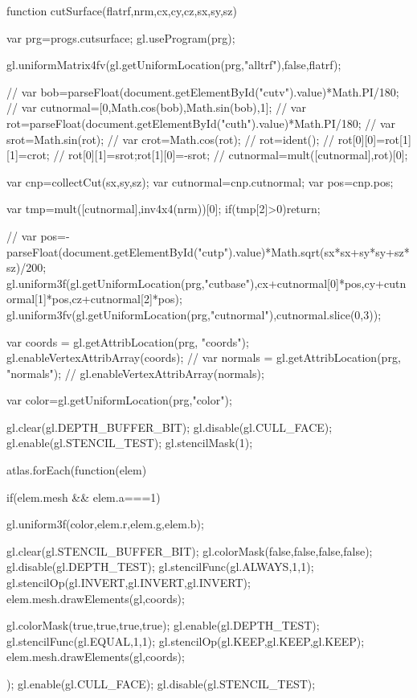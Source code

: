             function cutSurface(flatrf,nrm,cx,cy,cz,sx,sy,sz){
                var prg=progs.cutsurface;
                gl.useProgram(prg);
        
                gl.uniformMatrix4fv(gl.getUniformLocation(prg,"alltrf"),false,flatrf);
                
//                var bob=parseFloat(document.getElementById("cutv").value)*Math.PI/180;
//                var cutnormal=[0,Math.cos(bob),Math.sin(bob),1];
//                var rot=parseFloat(document.getElementById("cuth").value)*Math.PI/180;
//                var srot=Math.sin(rot);
//                var crot=Math.cos(rot);
//                rot=ident();
//                rot[0][0]=rot[1][1]=crot;
//                rot[0][1]=srot;rot[1][0]=-srot;
//                cutnormal=mult([cutnormal],rot)[0];

                var cnp=collectCut(sx,sy,sz);
                var cutnormal=cnp.cutnormal;
                var pos=cnp.pos;

                var tmp=mult([cutnormal],inv4x4(nrm))[0];
                if(tmp[2]>0)return;
                
//                var pos=-parseFloat(document.getElementById("cutp").value)*Math.sqrt(sx*sx+sy*sy+sz*sz)/200;
                gl.uniform3f(gl.getUniformLocation(prg,"cutbase"),cx+cutnormal[0]*pos,cy+cutnormal[1]*pos,cz+cutnormal[2]*pos);
                gl.uniform3fv(gl.getUniformLocation(prg,"cutnormal"),cutnormal.slice(0,3));
 
                var coords = gl.getAttribLocation(prg, "coords");
                gl.enableVertexAttribArray(coords);
//                var normals = gl.getAttribLocation(prg, "normals");
//                gl.enableVertexAttribArray(normals);
                
                var color=gl.getUniformLocation(prg,"color");
                
                gl.clear(gl.DEPTH_BUFFER_BIT);
                gl.disable(gl.CULL_FACE);
                gl.enable(gl.STENCIL_TEST);
                gl.stencilMask(1);
                
                atlas.forEach(function(elem){
                    if(elem.mesh && elem.a===1){
                        gl.uniform3f(color,elem.r,elem.g,elem.b);
                        
                        gl.clear(gl.STENCIL_BUFFER_BIT);
                        gl.colorMask(false,false,false,false);
                        gl.disable(gl.DEPTH_TEST);
                        gl.stencilFunc(gl.ALWAYS,1,1);
                        gl.stencilOp(gl.INVERT,gl.INVERT,gl.INVERT);
                        elem.mesh.drawElements(gl,coords);
                        
                        gl.colorMask(true,true,true,true);
                        gl.enable(gl.DEPTH_TEST);
                        gl.stencilFunc(gl.EQUAL,1,1);
                        gl.stencilOp(gl.KEEP,gl.KEEP,gl.KEEP);
                        elem.mesh.drawElements(gl,coords);
                    }
                });
                gl.enable(gl.CULL_FACE);
                gl.disable(gl.STENCIL_TEST);
                
            }
